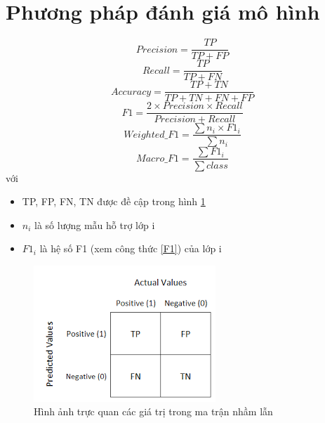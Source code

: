 \section{Phương pháp đánh giá mô hình}
\begin{equation}
    Precision=\frac{TP}{TP+FP}
    \label{P}
\end{equation}
\begin{equation}
    Recall=\frac{TP}{TP+FN}
    \label{R}
\end{equation}
\begin{equation}
    Accuracy=\frac{TP+TN}{TP+TN+FN+FP}
    \label{acc}
\end{equation}
\begin{equation}
    F1=\frac{2\times Precision \times Recall}{Precision+Recall}
    \label{F1}
\end{equation}
\begin{equation}
    Weighted\_F1=\frac{\sum{n_i\times F1_i}}{\sum{n_i}}
    \label{Weighted}
\end{equation}
\begin{equation}
    Macro\_F1=\frac{\sum{F1_i}}{\sum{class}}
    \label{MacroF1}
\end{equation}
với
\begin{itemize}
    \item TP, FP, FN, TN được đề cập trong hình \ref{confmat_img}
    \item $n_i$ là số lượng mẫu hỗ trợ lớp i
    \item $F1_i$ là hệ số F1 (xem công thức \eqref{F1}) của lớp i
\end{itemize} 

\begin{figure}[ht]
    \centering
    \includegraphics[width=0.5\linewidth]{images-5.png}
    \caption{Hình ảnh trực quan các giá trị trong ma trận nhầm lẫn}
    \label{confmat_img}
\end{figure}

